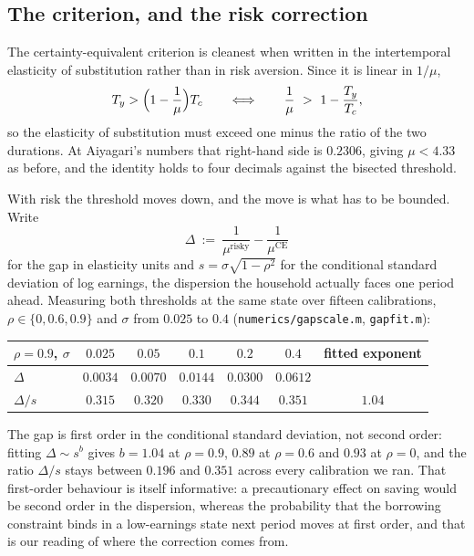 \subsection{The criterion, and the risk correction}

The certainty-equivalent criterion is cleanest when written in the intertemporal elasticity of
substitution rather than in risk aversion. Since it is linear in $1/\mu$,
\[
  T_y>\Bigl(1-\frac1\mu\Bigr)T_c
  \qquad\Longleftrightarrow\qquad
  \frac1\mu\ >\ 1-\frac{T_y}{T_c} ,
\]
so the elasticity of substitution must exceed one minus the ratio of the two durations. At
Aiyagari's numbers that right-hand side is $0.2306$, giving $\mu<4.33$ as before, and the identity
holds to four decimals against the bisected threshold.

With risk the threshold moves down, and the move is what has to be bounded. Write
\[
  \Delta\ :=\ \frac1{\mu^{\text{risky}}}-\frac1{\mu^{\text{CE}}}
\]
for the gap in elasticity units and $s=\sigma\sqrt{1-\rho^2}$ for the conditional standard
deviation of log earnings, the dispersion the household actually faces one period ahead. Measuring
both thresholds at the same state over fifteen calibrations, $\rho\in\{0,0.6,0.9\}$ and
$\sigma$ from $0.025$ to $0.4$ (\texttt{numerics/gapscale.m}, \texttt{gapfit.m}):

\begingroup\small
\begin{center}
\begin{tabular}{@{}lcccccc@{}}
\toprule
$\rho=0.9$, $\sigma$ & $0.025$ & $0.05$ & $0.1$ & $0.2$ & $0.4$ & fitted exponent\\
\midrule
$\Delta$ & $0.0034$ & $0.0070$ & $0.0144$ & $0.0300$ & $0.0612$ & \\
$\Delta/s$ & $0.315$ & $0.320$ & $0.330$ & $0.344$ & $0.351$ & $1.04$\\
\bottomrule
\end{tabular}
\end{center}
\endgroup

The gap is first order in the conditional standard deviation, not second order: fitting
$\Delta\sim s^{b}$ gives $b=1.04$ at $\rho=0.9$, $0.89$ at $\rho=0.6$ and $0.93$ at $\rho=0$, and
the ratio $\Delta/s$ stays between $0.196$ and $0.351$ across every calibration we ran. That
first-order behaviour is itself informative: a precautionary effect on saving would be second
order in the dispersion, whereas the probability that the borrowing constraint binds in a
low-earnings state next period moves at first order, and that is our reading of where the
correction comes from.


